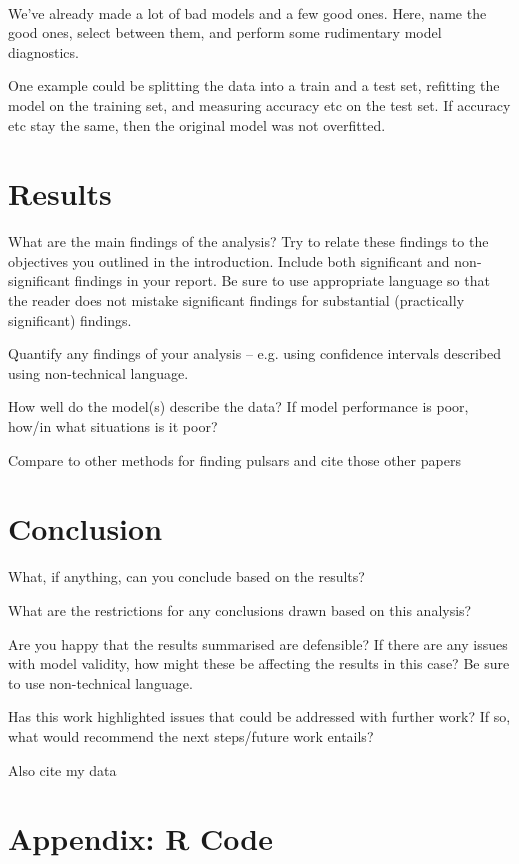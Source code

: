 \documentclass[11pt, oneside]{article}
\begin{document}
~~~

We've already made a lot of bad models and a few good ones. Here, name the good ones, select between them, and perform some rudimentary model diagnostics. 

One example could be splitting the data into a train and a test set, refitting the model on the training set, and measuring accuracy etc on the test set. If accuracy etc stay the same, then the original model was not overfitted. 

\section{Results}

What are the main findings of the analysis? Try to relate these findings to the objectives you outlined in the introduction. Include both significant and non-significant findings in your report. Be sure to use appropriate language so that the reader does not mistake significant findings for substantial (practically significant) findings.

Quantify any findings of your analysis – e.g. using confidence intervals described using non-technical language.

How well do the model(s) describe the data? If model performance is poor, how/in what situations is it poor?

Compare to other methods for finding pulsars and cite those other papers 

\section{Conclusion}

What, if anything, can you conclude based on the results? 

What are the restrictions for any conclusions drawn based on this analysis?

Are you happy that the results summarised are defensible? If there are any issues with model validity, how might these be affecting the results in this case? Be sure to use non-technical language.

Has this work highlighted issues that could be addressed with further work? If so, what would recommend the next steps/future work entails?

\begin{thebibliography}{9}

 
{\color{red}Also cite my data }
 
\end{thebibliography}

\section*{Appendix: R Code}
\end{document}
